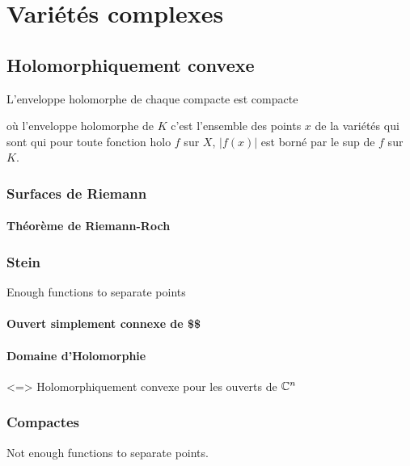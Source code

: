 \chapter{Variétés
complexes}

\section{Holomorphiquement
convexe}
L'enveloppe holomorphe de chaque compacte est compacte

où l'enveloppe holomorphe de $K$ c'est l'ensemble des points $x$ de la variétés qui sont qui pour toute fonction holo $f$ sur $X$, $|f(x)|$ est borné par le sup de $f$ sur $K$.

\subsection{Surfaces de Riemann}

\subsubsection{Théorème de Riemann-Roch}

\subsection{Stein}
Enough functions to separate points

\subsubsection{Ouvert simplement connexe de \$\C\$}

\subsubsection{Domaine 
d'Holomorphie}







<=> Holomorphiquement convexe
pour les ouverts de $\mathbb{C}^n$
                        
                        
                        
                        
                        
                        
                        

\subsection{Compactes}
Not enough functions to separate points.

